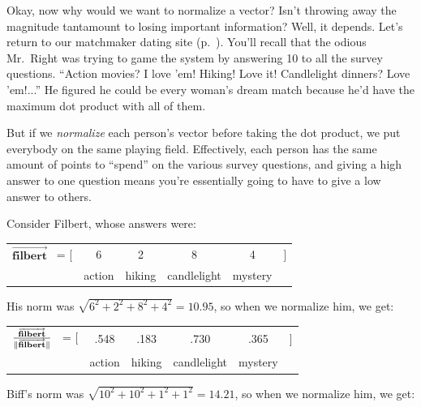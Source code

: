 \label{matchmakerGameTheSystemStart}

Okay, now why would we want to normalize a vector? Isn't throwing away the
magnitude tantamount to losing important information? Well, it depends. Let's
return to our matchmaker dating site (p.~\pageref{matchmakerExample}). You'll
recall that the odious Mr.~Right was trying to game the system by answering 10
to all the survey questions. ``Action movies? I love 'em! Hiking! Love it!
Candlelight dinners? Love 'em!...'' He figured he could be every woman's dream
match because he'd have the maximum dot product with all of them.

But if we \textit{normalize} each person's vector before taking the dot
product, we put everybody on the same playing field. Effectively, each person
has the same amount of points to ``spend'' on the various survey questions, and
giving a high answer to one question means you're essentially going to have to
give a low answer to others.


Consider Filbert, whose answers were:

\begin{center}
\begin{tabular}{cccccc}
$\overrightarrow{\textbf{filbert}}$ \quad \ = [ & 6 & 2 & 8 & 4 & ] \\
& \scriptsize{action} & \scriptsize{hiking} & \scriptsize{candlelight} &
\scriptsize{mystery} & \medskip \\
\end{tabular}
\end{center}
\vspace{-.15in}

His norm was $\sqrt{6^2+2^2+8^2+4^2}=10.95$, so when we normalize him, we get:

\begin{center}
\begin{tabular}{cccccc}
$\frac{\overrightarrow{\textbf{filbert}}}{\lVert\overrightarrow{\textbf{filbert}}\rVert}$
\quad \ = [ & .548 & .183 & .730 & .365 & ] \\
& \scriptsize{action} & \scriptsize{hiking} & \scriptsize{candlelight} &
\scriptsize{mystery} & \medskip \\
\end{tabular}
\end{center}
\vspace{-.15in}

Biff's norm was $\sqrt{10^2+10^2+1^2+1^2}=14.21$, so when we normalize him, we get:

